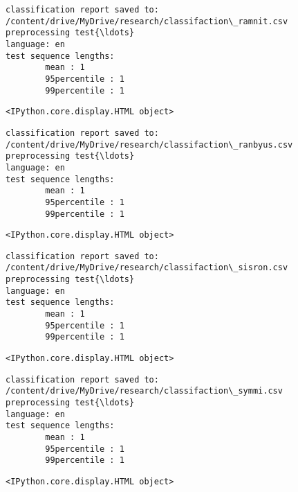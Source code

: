 \documentclass[11pt]{article}
\begin{document}
    
    \begin{Verbatim}[commandchars=\\\{\}]
classification report saved to:
/content/drive/MyDrive/research/classifaction\_ramnit.csv
preprocessing test{\ldots}
language: en
test sequence lengths:
        mean : 1
        95percentile : 1
        99percentile : 1
    \end{Verbatim}

    
    \begin{Verbatim}[commandchars=\\\{\}]
<IPython.core.display.HTML object>
    \end{Verbatim}

    
    \begin{Verbatim}[commandchars=\\\{\}]
classification report saved to:
/content/drive/MyDrive/research/classifaction\_ranbyus.csv
preprocessing test{\ldots}
language: en
test sequence lengths:
        mean : 1
        95percentile : 1
        99percentile : 1
    \end{Verbatim}

    
    \begin{Verbatim}[commandchars=\\\{\}]
<IPython.core.display.HTML object>
    \end{Verbatim}

    
    \begin{Verbatim}[commandchars=\\\{\}]
classification report saved to:
/content/drive/MyDrive/research/classifaction\_sisron.csv
preprocessing test{\ldots}
language: en
test sequence lengths:
        mean : 1
        95percentile : 1
        99percentile : 1
    \end{Verbatim}

    
    \begin{Verbatim}[commandchars=\\\{\}]
<IPython.core.display.HTML object>
    \end{Verbatim}

    
    \begin{Verbatim}[commandchars=\\\{\}]
classification report saved to:
/content/drive/MyDrive/research/classifaction\_symmi.csv
preprocessing test{\ldots}
language: en
test sequence lengths:
        mean : 1
        95percentile : 1
        99percentile : 1
    \end{Verbatim}

    
    \begin{Verbatim}[commandchars=\\\{\}]
<IPython.core.display.HTML object>
    \end{Verbatim}
\end{document}
